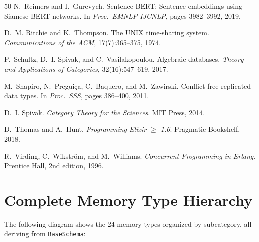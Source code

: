 \documentclass[12pt,a4paper]{article}
\theoremstyle{definition}
\begin{document}
\begin{thebibliography}{50}
N.~Reimers and I.~Gurevych.
\newblock Sentence-{BERT}: Sentence embeddings using {Siamese BERT}-networks.
\newblock In \emph{Proc.\ EMNLP-IJCNLP}, pages 3982--3992, 2019.

D.~M. Ritchie and K.~Thompson.
\newblock The {UNIX} time-sharing system.
\newblock \emph{Communications of the ACM}, 17(7):365--375, 1974.

P.~Schultz, D.~I. Spivak, and C.~Vasilakopoulou.
\newblock Algebraic databases.
\newblock \emph{Theory and Applications of Categories}, 32(16):547--619, 2017.

M.~Shapiro, N.~Pregui\c{c}a, C.~Baquero, and M.~Zawirski.
\newblock Conflict-free replicated data types.
\newblock In \emph{Proc.\ SSS}, pages 386--400, 2011.

D.~I. Spivak.
\newblock \emph{Category Theory for the Sciences}.
\newblock MIT Press, 2014.

D.~Thomas and A.~Hunt.
\newblock \emph{Programming Elixir $\geq$ 1.6}.
\newblock Pragmatic Bookshelf, 2018.

R.~Virding, C.~Wikstr\"om, and M.~Williams.
\newblock \emph{Concurrent Programming in Erlang}.
\newblock Prentice Hall, 2nd edition, 1996.

\end{thebibliography}

\appendix

\section{Complete Memory Type Hierarchy}\label{app:type-hierarchy}

The following diagram shows the 24 memory types organized by subcategory, all deriving from \texttt{BaseSchema}:
\end{document}
